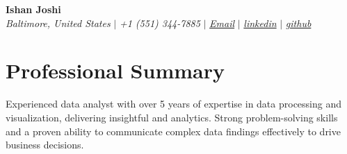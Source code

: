 \documentclass[letterpaper,10pt]{article}
\makeatletter
\newcommand{\sectionspace}{
\vspace{-20pt}
}
\newcommand{\subheadingtitlevspace}{
\vspace{-3pt}
}
\newcommand{\titleItem}[1]{
  \textbf{#1}
}
\newcommand{\resumeProjectHeading}[2]{
    \item
    \begin{tabular*}{0.97\textwidth}{l@{\extracolsep{\fill}}r}
      #1 & \textit{ #2} \\
    \end{tabular*}\vspace{-9pt}
}
\newcommand{\resumeSubHeadingListStart}{\subheadingtitlevspace\begin{itemize}[leftmargin=0.15in, label={}]}
\newcommand{\resumeSubHeadingListEnd}{\end{itemize}}
\makeatother
\begin{document}

\begin{flushleft}
    \textbf{\large Ishan Joshi} \\    
    \textit{Baltimore, United States} $|$ 
    \textit{+1 (551) 344-7885‬} $|$  
    \href{mailto:ishan.joshiapplication@gmail.com}{{\textit{Email}}} $|$ 
    \href{https://www.linkedin.com/in/ishanjoshi6286/}{{\textit{linkedin}}} $|$
    \href{https://123ishan.github.io/portfolio/}{{\textit{github}}}
    \vspace{-8pt}
\end{flushleft}


\section{Professional Summary}
\vspace{-3pt}
\begin{itemize}[leftmargin=0.15in, label={}]
    {\item{
     {Experienced data analyst with over 5 years of expertise in data processing and visualization, delivering insightful and analytics. Strong problem-solving skills and a proven ability to communicate complex data findings effectively to drive business decisions.} \\      
    }}
 \end{itemize}
 \sectionspace



\end{document}
